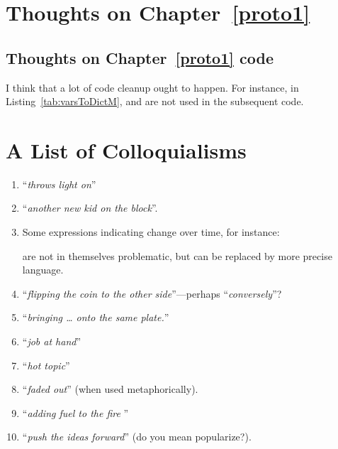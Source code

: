 \begin{scope}
\section{Thoughts on Chapter~\ref{proto1}}\label{sec:thoughts-chapt-proto1}

\subsection{Thoughts on Chapter~\ref{proto1}
  code}\label{sec:thoughts-chapt-proto1-code}

I think that a lot of code cleanup ought to happen.  For instance, in
Listing~\vref{tab:varsToDictM},  and
 are not used in the subsequent code.

\section{A List of Colloquialisms}\label{sec:list-colloquialisms}
\begin{enumerate}
\item
  ``\textit{throws light on}''
\item
  ``\textit{another new kid on the block}''.
\item
  Some expressions indicating change over time, for instance:
  are not in themselves problematic, but can be replaced by
  more precise language.
\item
  ``\textit{flipping the coin to the other side}''---perhaps ``\textsl{conversely}''? 
\item 
  ``\textit{bringing \dots{} onto the same plate.}''
\item
  ``\textit{job at hand}''
\item
  ``\textit{hot topic}''
\item
  ``\textit{faded out}''  (when used metaphorically).
\item
  ``\textit{adding fuel to the fire }''
\item
  ``\textit{push the ideas forward}'' (do you mean popularize?).
\end{enumerate}

\end{scope}

